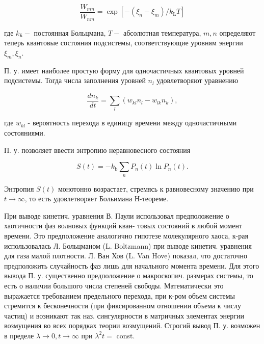 \documentclass[10pt]{article}
\begin{document}
\[

\frac{W_{m n}}{W_{n m}}=\exp \left[-\left(\xi_{n}-\xi_{m}\right) / k_{\mathrm{L}} T\right]

\]



где $k_{\mathrm{Б}}-$ постоянная Больцмана, $T-$ абсолютная температура, $m, n$ определяют теперь квантовые состояния подсистемы, соответствующие уровням энергии $\xi_{m}, \xi_{n}$.



П. у. имеет наиболее простую форму для одночастичных квантовых уровней подсистемы. Тогда числа заполнения уровней $n_{l}$ удовлетворяют уравнению



\[

\frac{d n_{k}}{d t}=\sum_{l}\left(w_{k l} n_{l}-w_{l k} n_{k}\right),

\]



где $w_{k l}$ - вероятность перехода в единицу времени между одночастичными состояниями.



П. у. позволяет ввести энтропию неравновесного состояния



\[

S(t)=-k_{\mathrm{b}} \sum_{n} P_{n}(t) \ln P_{n}(t) .

\]



Энтропия $S(t)$ монотонно возрастает, стремясь к равновесному значению при $t \rightarrow \infty$, то есть удовлетворяет Больимана Н-теореме.



При выводе кинетич. уравнения В. Паули использовал предположение о хаотичности фаз волновых функций кван- товых состояний в любой момент времени. Это предположение аналогично гипотезе молекулярного хаоса, к-рая использовалась Л. Больцманом (L. Boltzmann) при выводе кинетич. уравнения для газа малой плотности. Л. Ван Хов (L. Van Hove) показал, что достаточно предположить случайность фаз лишь для начального момента времени. Для этого вывода П. у. существенно предположение о макроскопич. размерах системы, то есть о наличии большого числа степеней свободы. Математически это выражается требованием предельного перехода, при к-ром объем системы стремится к бесконечности (при фиксированном отношении объема к числу частиц) и возникают так наз. сингулярности в матричных элементах энергии возмущения во всех порядках теории возмущений. Строгий вывод П. у. возможен в пределе $\lambda \rightarrow 0, t \rightarrow \infty$ при $\lambda^{2} t=$ const.
\end{document}
